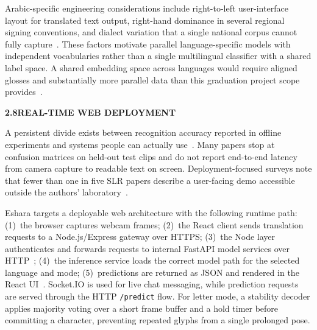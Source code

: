 \noindent Arabic-specific engineering considerations include right-to-left user-interface layout for translated text output, right-hand dominance in several regional signing conventions, and dialect variation that a single national corpus cannot fully capture~\cite{sidig2021karsl,arthur2018arasl2018}. These factors motivate parallel language-specific models with independent vocabularies rather than a single multilingual classifier with a shared label space. A shared embedding space across languages would require aligned glosses and substantially more parallel data than this graduation project scope provides~\cite{camgoz2018neural}.\par\vspace{0.3cm}

\noindent\textbf{2.8\quad REAL-TIME WEB DEPLOYMENT}\par
{}
\vspace{0.2cm}

\noindent A persistent divide exists between recognition accuracy reported in offline experiments and systems people can actually use~\cite{rastgoo2021survey,sterpu2018sign}. Many papers stop at confusion matrices on held-out test clips and do not report end-to-end latency from camera capture to readable text on screen. Deployment-focused surveys note that fewer than one in five SLR papers describe a user-facing demo accessible outside the authors' laboratory~\cite{adaloglou2022comprehensive}.\par\vspace{0.2cm}

\noindent Eshara targets a deployable web architecture with the following runtime path: (1)~the browser captures webcam frames; (2)~the React client sends translation requests to a Node.js/Express gateway over HTTPS; (3)~the Node layer authenticates and forwards requests to internal FastAPI model services over HTTP~\cite{rfc9110,fastapi}; (4)~the inference service loads the correct model path for the selected language and mode; (5)~predictions are returned as JSON and rendered in the React UI~\cite{react}. Socket.IO is used for live chat messaging, while prediction requests are served through the HTTP \texttt{/predict} flow. For letter mode, a stability decoder applies majority voting over a short frame buffer and a hold timer before committing a character, preventing repeated glyphs from a single prolonged pose.\par\vspace{0.2cm}

